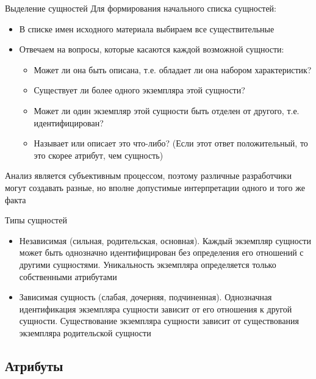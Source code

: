\documentclass[12pt]{article}
\begin{document}
\begin{nota}{Выделение сущностей}
    Для формирования начального списка сущностей:

    \begin{itemize}
        \item В списке имен исходного материала выбираем все существительные 
        \item Отвечаем на вопросы, которые касаются каждой возможной сущности:
        
        \begin{itemize}
            \item Может ли она быть описана, т.е. обладает ли она набором характеристик?
            \item Существует ли более одного экземпляра этой сущности?
            \item Может ли один экземпляр этой сущности быть отделен от другого, т.е. идентифицирован?
            \item Называет или описает это что-либо? (Если этот ответ положительный, то это скорее атрибут, чем сущность)
        \end{itemize}
    \end{itemize}

    Анализ является субъективным процессом, поэтому различные разработчики могут создавать разные, но вполне допустимые интерпретации одного и того же факта 
\end{nota}

\begin{nota}{Типы сущностей}
    \begin{itemize}
        \item Независимая (сильная, родительская, основная). Каждый экземпляр сущности может быть однозначно идентифицирован без определения его отношений с другими сущностями. Уникальность экземпляра определяется только собственными атрибутами 
        \item Зависимая сущность (слабая, дочерняя, подчиненная). Однозначная идентификация экземпляра сущности зависит от его отношения к другой сущности. Существование экземпляра сущности зависит от существования экземпляра родительской сущности 
    \end{itemize}
\end{nota}

\newpage 

\subsection{Атрибуты}
\end{document}
